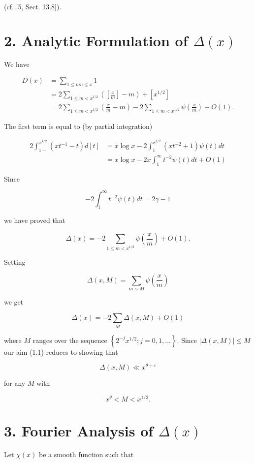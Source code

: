 \documentclass[10pt]{article}
\begin{document}
(cf. [5, Sect. 13.8]).

\section*{2. Analytic Formulation of $\Delta(x)$}
We have

$$
\begin{aligned}
D(x) & =\sum_{1\leqslant mn\leqslant x}1 \\
& =2 \sum_{1 \leqslant m<x^{1 / 2}}\left(\left[\frac{x}{m}\right]-m\right)+\left[x^{1 / 2}\right] \\
& =2 \sum_{1 \leqslant m<x^{1 / 2}}\left(\frac{x}{m}-m\right)-2 \sum_{1 \leqslant m<x^{1 / 2}} \psi\left(\frac{x}{m}\right)+O(1) .
\end{aligned}
$$

The first term is equal to (by partial integration)

$$
\begin{aligned}
2 \int_{1-}^{x^{1 / 2}}\left(x t^{-1}-t\right) d[t] & =x \log x-2 \int_{1}^{x^{1 / 2}}\left(x t^{-2}+1\right) \psi(t) d t \\
& =x \log x-2 x \int_{1}^{\infty} t^{-2} \psi(t) d t+O(1)
\end{aligned}
$$

Since

$$
-2 \int_{1}^{\infty} t^{-2} \psi(t) d t=2 \gamma-1
$$

we have proved that

$$
\Delta(x)=-2 \sum_{1 \leqslant m<x^{1 / 2}} \psi\left(\frac{x}{m}\right)+O(1) .
$$

Setting

$$
\Delta(x, M)=\sum_{m \sim M} \psi\left(\frac{x}{m}\right)
$$

we get

$$
\Delta(x)=-2 \sum_{M} \Delta(x, M)+O(1)
$$

where $M$ ranges over the sequence $\left\{2^{-j} x^{1 / 2} ; j=0,1, \ldots\right\}$. Since $|\Delta(x, M)| \leqslant M$ our aim (1.1) reduces to showing that


\begin{equation*}
\Delta(x, M) \ll x^{\theta+\varepsilon} \tag{2.1}
\end{equation*}


for any $M$ with


\begin{equation*}
x^{\theta}<M<x^{1 / 2} . \tag{2.2}
\end{equation*}


\section*{3. Fourier Analysis of $\Delta(x)$}
Let $\chi(x)$ be a smooth function such that
\end{document}
